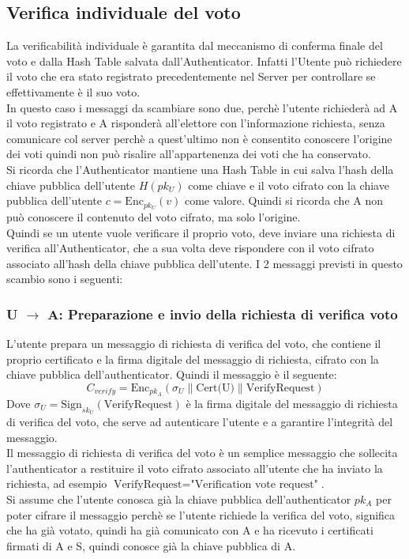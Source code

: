\subsection{Verifica individuale del voto}
La verificabilità individuale è garantita dal meccanismo di conferma finale del voto e dalla Hash Table salvata dall'Authenticator. Infatti l'Utente può richiedere il voto che era stato registrato precedentemente nel Server per controllare se effettivamente è il suo voto.\\
In questo caso i messaggi da scambiare sono due, perchè l'utente richiederà ad A il voto registrato e A risponderà all'elettore con l'informazione richiesta, senza comunicare col server perchè a quest'ultimo non è consentito conoscere l'origine dei voti quindi non può risalire all'appartenenza dei voti che ha conservato.\\
Si ricorda che l'Authenticator mantiene una Hash Table in cui salva l'hash della chiave pubblica dell'utente $H(pk_U)$ come chiave e il voto cifrato con la chiave pubblica dell'utente $c=\text{Enc}_{pk_U}(v)$ come valore. Quindi si ricorda che A non può conoscere il contenuto del voto cifrato, ma solo l'origine.\\
Quindi se un utente vuole verificare il proprio voto, deve inviare una richiesta di verifica all'Authenticator, che a sua volta deve rispondere con il voto cifrato associato all'hash della chiave pubblica dell'utente.
I 2 messaggi previsti in questo scambio sono i seguenti:
\subsubsection{U $\to$ A: Preparazione e invio della richiesta di verifica voto}
	L'utente prepara un messaggio di richiesta di verifica del voto, che contiene il proprio certificato e la firma digitale del messaggio di richiesta, cifrato con la chiave pubblica dell'authenticator. Quindi il messaggio è il seguente:
	$$ C_{verify} = \text{Enc}_{pk_A}(\sigma_{U} \| \text{Cert(U)} \| \text{VerifyRequest}) $$
	Dove $\sigma_{U} = \text{Sign}_{sk_U}(\text{VerifyRequest})$ è la firma digitale del messaggio di richiesta di verifica del voto, che serve ad autenticare l'utente e a garantire l'integrità del messaggio.\\
	Il messaggio di richiesta di verifica del voto è un semplice messaggio che sollecita l'authenticator a restituire il voto cifrato associato all'utente che ha inviato la richiesta, ad esempio $\text{VerifyRequest} = \text{"Verification vote request"}$.\\
	Si assume che l'utente conosca già la chiave pubblica dell'authenticator $pk_A$ per poter cifrare il messaggio perchè se l'utente richiede la verifica del voto, significa che ha già votato, quindi ha già comunicato con A e ha ricevuto i certificati firmati di A e S, quindi conosce già la chiave pubblica di A.
	
